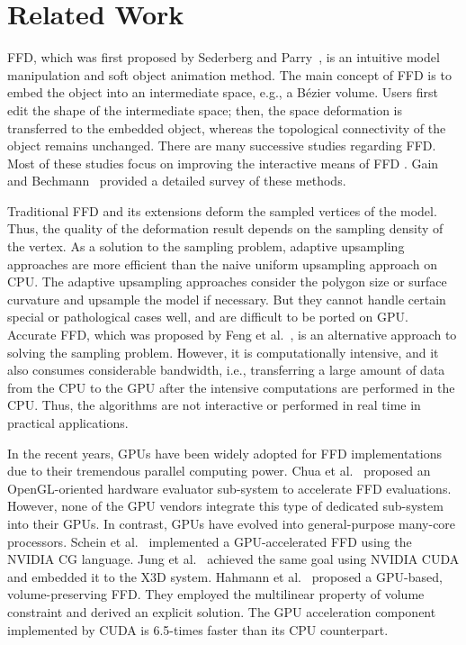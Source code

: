 \documentclass[3p]{elsarticle}
\begin{document}

\section{Related Work}\label{sec:related}

FFD, which was first proposed by Sederberg and Parry~\cite{Sederberg86}, is an intuitive model manipulation and soft
object animation method. The main concept of FFD is to embed the object into an intermediate space, e.g., a B\'ezier
volume. Users first edit the shape of the intermediate space; then, the space deformation is transferred to the embedded
object, whereas the topological connectivity of the object remains unchanged. There are many successive studies
regarding FFD. Most of these studies focus on improving the interactive means of FFD \cite{Coquillart90, Hui02,
MacCracken96, McDonnel07, Xu13}. Gain and Bechmann~\cite{Gain08} provided a detailed survey of these methods.

Traditional FFD and its extensions deform the sampled vertices of the model. Thus, the quality of the deformation result
depends on the sampling density of the vertex. As a solution to the sampling problem, adaptive upsampling approaches
\cite{Gain99, Griessmair89, Parry86} are more efficient than the naive uniform upsampling approach on CPU. The adaptive
upsampling approaches consider the polygon size or surface curvature and upsample the model if necessary. But they
cannot handle certain special or pathological cases well, and are difficult to be ported on GPU. Accurate FFD, which
was proposed by Feng et al.~\cite{Feng98, Feng02, Feng00}, is an alternative approach to solving the sampling problem.
However, it is computationally intensive, and it also consumes considerable bandwidth, i.e., transferring a large amount
of data from the CPU to the GPU after the intensive computations are performed in the CPU. Thus, the algorithms are not
interactive or performed in real time in practical applications.

In the recent years, GPUs have been widely adopted for FFD implementations due to their tremendous parallel computing
power. Chua et al.~\cite{Chua00} proposed an OpenGL-oriented hardware evaluator sub-system to accelerate FFD
evaluations. However, none of the GPU vendors integrate this type of dedicated sub-system into their GPUs. In contrast,
GPUs have evolved into general-purpose many-core processors. Schein et al.~\cite{Schein06} implemented a GPU-accelerated
FFD using the NVIDIA CG language. Jung et al.~\cite{Jung11} achieved the same goal using NVIDIA CUDA and embedded it to
the X3D system. Hahmann et al.~\cite{Hahmann12} proposed a GPU-based, volume-preserving FFD. They employed the
multilinear property of volume constraint and derived an explicit solution. The GPU acceleration component implemented
by CUDA is 6.5-times faster than its CPU counterpart.
\end{document}
